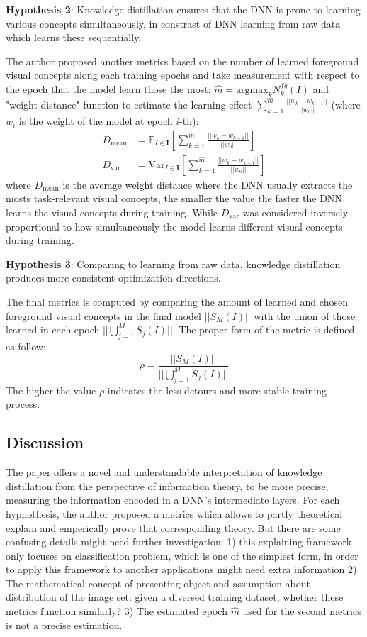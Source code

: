 \textbf{Hypothesis 2}: Knowledge distillation ensures that the DNN is prone to learning various concepts simultaneously, in constrast of DNN learning from raw data which learns these sequentially.

The author proposed another metrics based on the number of learned foreground visual concepts along each training epochs and take measurement with respect to the epoch that the model learn those the most: $\hat{m} = \text{argmax}_k N_{k}^{fg}(I)$ and "weight distance" function to estimate the learning effect $\displaystyle \sum_{k=1}^{\hat{m}} \frac{||w_k - w_{k-1}||}{||w_0||}$ (where $w_i$ is the weight of the model at epoch $i$-th):
\begin{align*}
  D_{\text{mean}} &= \mathbb{E}_{I \in \textbf{I}} \left[\displaystyle \sum_{k=1}^{\hat{m}} \frac{||w_k - w_{k-1}||}{||w_0||} \right] \\ 
  D_{\text{var}} &= \text{Var}_{I \in \textbf{I}} \left[\displaystyle \sum_{k=1}^{\hat{m}} \frac{||w_k - w_{k-1}||}{||w_0||}\right] 
\end{align*}
where $D_{\text{mean}}$ is the average weight distance where the DNN usually extracts the mosts task-relevant visual concepts, the smaller the value the faster the DNN learns the visual concepts during training. While $D_{\text{var}}$ was considered inversely proportional to how simultaneously the model learns different visual concepts during training.

\textbf{Hypothesis 3}: Comparing to learning from raw data, knowledge distillation produces more consistent optimization directions. 

The final metrics is computed by comparing the amount of learned and chosen foreground visual concepts in the final model $||S_M(I)||$ with the union of those learned in each epoch $||\bigcup_{j=1}^MS_j(I)||$. The proper form of the metric is defined as follow:
\[
  \rho = \frac{||S_M(I)||}{||\bigcup_{j=1}^MS_j(I)||}
\]
The higher the value $\rho$ indicates the less detours and more stable training process.

\subsection{Discussion}
The paper offers a novel and understandable interpretation of knowledge distillation from the perspective of information theory, to be more precise, measuring the information encoded in a DNN's intermediate layers. For each hyphothesis, the author proposed a metrics which allows to partly theoretical explain and emperically prove that corresponding theory. But there are some confusing details might need further investigation: 1) this explaining framework only focuses on classification problem, which is one of the simplest form, in order to apply this framework to another applications might need extra information 2) The mathematical concept of presenting object and assumption about distribution of the image set: given a diversed training dataset, whether these metrics function similarly? 3) The estimated epoch $\hat{m}$ used for the second metrics is not a precise estimation.
